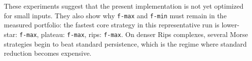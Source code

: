 These experiments suggest that the present implementation is not yet optimized for small inputs.  They also show why \texttt{f-max} and \texttt{f-min} must remain in the measured portfolio: the fastest core strategy in this representative run is lower-star: \texttt{f-max}, plateau: \texttt{f-max}, rips: \texttt{f-max}.
On denser Rips complexes, several Morse strategies begin to beat standard persistence, which is the regime where standard reduction becomes expensive.
